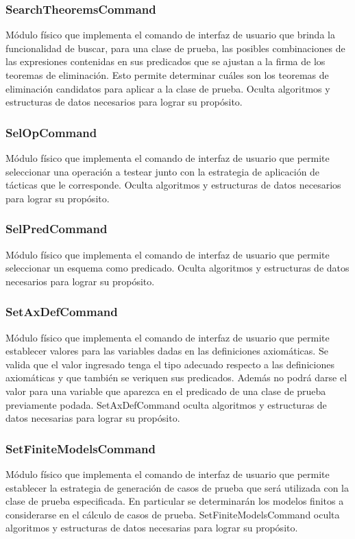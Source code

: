 \documentclass[a4paper,10pt]{report}
\begin{document}
			\subsubsection{SearchTheoremsCommand}
			Módulo físico que implementa el comando de interfaz de usuario que brinda la funcionalidad de buscar, para una clase de prueba, las posibles combinaciones de las expresiones contenidas en sus predicados que se ajustan a la firma de los teoremas de eliminación. Esto permite determinar cuáles son los teoremas de eliminación candidatos para aplicar a la clase de prueba. Oculta algoritmos y estructuras de datos necesarios para lograr su propósito.
			\subsubsection{SelOpCommand}
			Módulo físico que implementa el comando de interfaz de usuario que permite seleccionar una operación a testear junto con la estrategia de aplicación de tácticas que le corresponde. Oculta algoritmos y estructuras de datos necesarios para lograr su propósito.
			\subsubsection{SelPredCommand}
			Módulo físico que implementa el comando de interfaz de usuario que permite seleccionar un esquema como predicado. Oculta algoritmos y estructuras de datos necesarios para lograr su propósito.
			\subsubsection{SetAxDefCommand}
			Módulo físico que implementa el comando de interfaz de usuario que permite establecer valores para las variables dadas en las definiciones axiomáticas. Se valida que el valor ingresado tenga el tipo adecuado respecto a las definiciones axiomáticas y que también se veriquen sus predicados. Además no podrá darse el valor para una variable que aparezca en el predicado de una clase de prueba previamente podada. SetAxDefCommand oculta algoritmos y estructuras de datos necesarias para lograr su propósito.
			\subsubsection{SetFiniteModelsCommand}
			Módulo físico que implementa el comando de interfaz de usuario que permite establecer la estrategia de generación de casos de prueba que será utilizada con la clase de prueba especificada. En particular se determinarán los modelos finitos a considerarse en el cálculo de casos de prueba. SetFiniteModelsCommand oculta algoritmos y estructuras de datos necesarias para lograr su propósito.
\end{document}
